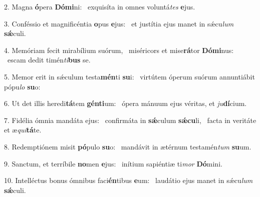 2. Magna \textbf{ó}pera \textbf{Dó}\textbf{mi}ni: \ast\  exquisíta in omnes voluntá\textit{tes} \textbf{e}jus.\

3. Conféssio et magnificéntia \textbf{o}pus \textbf{e}jus: \ast\  et justítia ejus manet in sǽcu\textit{lum} \textbf{sǽ}culi.\

4. Memóriam fecit mirabílium suórum, \dag\  miséricors et mise\textbf{rá}tor \textbf{Dó}\textbf{mi}nus: \ast\  escam dedit timén\textit{ti}\textbf{bus} se.\

5. Memor erit in sǽculum testa\textbf{mén}ti \textbf{su}i: \ast\  virtútem óperum suórum annuntiábit pópu\textit{lo} \textbf{su}o:\

6. Ut det illis heredi\textbf{tá}tem \textbf{gén}\textbf{ti}um: \ast\  ópera mánuum ejus véritas, et \textit{ju}\textbf{dí}cium.\

7. Fidélia ómnia mandáta ejus: \dag\  confirmáta in \textbf{sǽ}culum \textbf{sǽ}\textbf{cu}li, \ast\  facta in veritáte et æ\textit{qui}\textbf{tá}te.\

8. Redemptiónem misit \textbf{pó}pulo \textbf{su}o: \ast\  mandávit in ætérnum testamén\textit{tum} \textbf{su}um.\

9. Sanctum, et terríbile \textbf{no}men \textbf{e}jus: \ast\  inítium sapiéntiæ ti\textit{mor} \textbf{Dó}mini.\

10. Intelléctus bonus ómnibus faci\textbf{én}tibus \textbf{e}um: \ast\  laudátio ejus manet in sǽcu\textit{lum} \textbf{sǽ}culi.\

